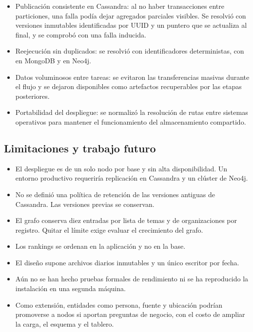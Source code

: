 \documentclass[11pt,a4paper]{article}
\newcommand{\code}[1]{\detokenize{#1}}
\begin{document}
\begin{itemize}
    \item Publicación consistente en Cassandra: al no haber transacciones entre particiones, una falla podía dejar agregados parciales visibles. Se resolvió con versiones inmutables identificadas por UUID y un puntero que se actualiza al final, y se comprobó con una falla inducida.
    \item Reejecución sin duplicados: se resolvió con identificadores deterministas, \code{upsert} con \code{$setOnInsert} en MongoDB y \code{MERGE} en Neo4j.
    \item Datos voluminosos entre tareas: se evitaron las transferencias masivas durante el flujo y se dejaron disponibles como artefactos recuperables por las etapas posteriores.
    \item Portabilidad del despliegue: se normalizó la resolución de rutas entre sistemas operativos para mantener el funcionamiento del almacenamiento compartido.
\end{itemize}

\subsection{Limitaciones y trabajo futuro}

\begin{itemize}
    \item El despliegue es de un solo nodo por base y sin alta disponibilidad. Un entorno productivo requeriría replicación en Cassandra y un clúster de Neo4j.
    \item No se definió una política de retención de las versiones antiguas de Cassandra. Las versiones previas se conservan.
    \item El grafo conserva diez entradas por lista de temas y de organizaciones por registro. Quitar el límite exige evaluar el crecimiento del grafo.
    \item Los rankings se ordenan en la aplicación y no en la base.
    \item El diseño supone archivos diarios inmutables y un único escritor por fecha.
    \item Aún no se han hecho pruebas formales de rendimiento ni se ha reproducido la instalación en una segunda máquina.
    \item Como extensión, entidades como persona, fuente y ubicación podrían promoverse a nodos si aportan preguntas de negocio, con el costo de ampliar la carga, el esquema y el tablero.
\end{itemize}
\end{document}
